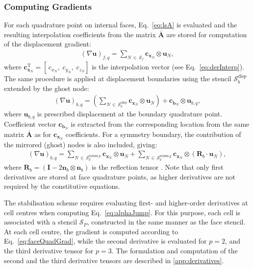 \documentclass[review,3p]{elsarticle}
\newcommand{\bb}{\boldsymbol}
\begin{document}
\subsubsection{Computing Gradients}
\label{sec:grad}
%
For each quadrature point on internal faces, Eq.~\eqref{eq:lsA} is evaluated and the resulting interpolation coefficients from the matrix $\mathbf{\bar{A}}$ are stored for computation of the displacement gradient:
%
\begin{eqnarray}\label{eq:faceQuadGrad}
	(\nabla \bb{u})_{f,q} = \sum_{N \,\in\,  \mathcal{S}_f}  \bb{c}_{\bb{x}_N} \otimes \bb{u}_N,
\end{eqnarray}
%
where $\bb{c}_{\bb{x}_N}^{\mathrm{T}} = \left[ \,c_{x_N}, \; c_{y_N},\; c_{z_N} \right]$ is the interpolation vector (see Eq.~\eqref{eq:derInterp}).
The same procedure is applied at displacement boundaries using the stencil $\mathcal{S}_b^{\text{disp}}$  extended by the ghost node:
%
\begin{eqnarray}
	(\nabla \bb{u})_{b,q} = \left(\sum_{N \,\in\,  \mathcal{S}_b^{\text{disp}}}  \bb{c}_{\bb{x}_N} \otimes \bb{u}_N \right)+ \bb{c}_{\bb{b}_N} \otimes \bb{u}_{b,q},
\end{eqnarray}
%
where $\bb{u}_{b,q}$ is prescribed displacement at the boundary quadrature point. Coefficient vector $\bb{c}_{\bb{b}_N}$ is extracted from the corresponding location from the same matrix $\mathbf{\bar{A}}$ as for $\bb{c}_{\bb{x}_N}$ coefficients.
For a symmetry boundary, the contribution of the mirrored (ghost) nodes is also included, giving:
%
\begin{eqnarray}
	(\nabla \bb{u})_{b,q} =
	\sum_{N \,\in\,  \mathcal{S}_b^{\text{symm,p}}}  \bb{c}_{\bb{x}_N} \otimes \bb{u}_N +
	\sum_{N \,\in\,  \mathcal{S}_b^{\text{symm,g}}}  \bb{c}_{\bb{x}_N} \otimes ( \bb{R}_b \cdot \bb{u}_N),
\end{eqnarray}
%
where $ \bb{R}_b = (\bb{I}-2\bb{n}_b \otimes \bb{n}_b)$ is the reflection tensor \cite{Demirdzic2022}.
Note that only first derivatives are stored at face quadrature points, as higher derivatives are not required by the constitutive equations.

The stabilisation scheme requires evaluating first- and higher-order derivatives at cell centres when computing Eq.~\eqref{eq:alphaJump}.
For this purpose, each cell is associated with a stencil $\mathcal{S}_P$, constructed in the same manner as the face stencil.
At each cell centre, the gradient is computed according to Eq.~\eqref{eq:faceQuadGrad}, while the second derivative is evaluated for $p = 2$, and the third derivative tensor for $p = 3$.
The formulation and computation of the second and the third derivative tensors are described in \ref{app:derivatives}.
%
%
\end{document}
